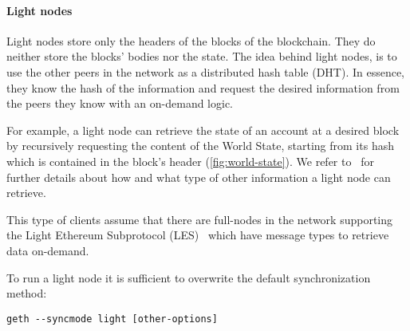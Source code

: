 \paragraph{Light nodes}
Light nodes store only the headers of the blocks of the blockchain. They do
neither store the blocks' bodies nor the state. The idea behind light nodes, is
to use the other peers in the network as a distributed hash table (DHT). In
essence, they know the hash of the information and request the desired
information from the peers they know with an on-demand logic.

For example, a light node can retrieve the state of an account at a desired
block by recursively requesting the content of the World State, starting from
its hash which is contained in the block's header (\autoref{fig:world-state}).
We refer to~\cite{bib:light-client} for further details about how and what type
of other information a light node can retrieve.

This type of clients assume that there are full-nodes in the network supporting
the Light Ethereum Subprotocol (LES)~\cite{bib:les-protocol} which have message
types to retrieve data on-demand.

To run a light node it is sufficient to overwrite the default synchronization
method:
\begin{center}
    \verb|geth --syncmode light [other-options]|
\end{center}